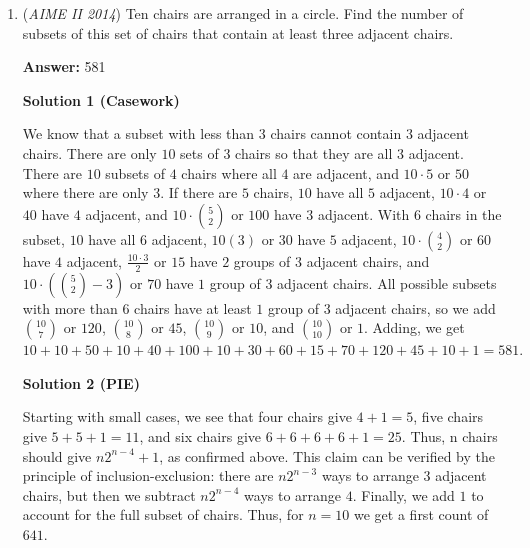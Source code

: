 \begin{enumerate}
 Applying Heron's Formula, we get
 \[\sqrt{2(2-4r)(r)(3r)} = \sqrt{6r^2(2-4r)}.\]We set this equal to $\frac{1}{2}r(2-3r)$. 
 \[\sqrt{6r^2(2-4r)} = \frac{1}{2}r(2-3r).\]This simplifies to the quadratic equation $0 = 9r^2+84r-44$. Remember that we are solving for $3r$, which we will set equal to $x$. Then we now have the equation $0 = x^2 +28x - 44$. Applying the quadratic formula, we get $x=-14 \pm 4\sqrt{15}$. We want the positive solution, so we take $4\sqrt{15}-14 = \sqrt{240}-14$. Our answer is therefore $240 + 14 = \boxed{254}$.

 


	\item (\textit{AIME II 2014}) Ten chairs are arranged in a circle. Find the number of subsets of this set of chairs that contain at least three adjacent chairs.


 
 \textbf{Answer: }581



\textbf{Solution 1 (Casework)}

We know that a subset with less than $3$ chairs cannot contain $3$ adjacent chairs.  There are only $10$ sets of $3$ chairs so that they are all $3$ adjacent.  There are $10$ subsets of $4$ chairs where all $4$ are adjacent, and $10 \cdot 5$ or $50$ where there are only $3.$  If there are $5$ chairs, $10$ have all $5$ adjacent, $10 \cdot 4$ or $40$ have $4$ adjacent, and $10 \cdot {5\choose 2}$ or $100$ have $3$ adjacent.  With $6$ chairs in the subset, $10$ have all $6$ adjacent, $10(3)$ or $30$ have $5$ adjacent, $10 \cdot {4\choose2}$ or $60$ have $4$ adjacent, $\frac{10 \cdot 3}{2}$ or $15$ have $2$ groups of $3$ adjacent chairs, and $10 \cdot \left({5\choose2} - 3\right)$ or $70$ have $1$ group of $3$ adjacent chairs.  All possible subsets with more than $6$ chairs have at least $1$ group of $3$ adjacent chairs, so we add ${10\choose7}$ or $120$, ${10\choose8}$ or $45$, ${10\choose9}$ or $10$, and ${10\choose10}$ or $1.$  Adding, we get $10 + 10 + 50 + 10 + 40 + 100 + 10 + 30 + 60 + 15 + 70 + 120 + 45 + 10 + 1 = \boxed{581}.$




\textbf{Solution 2 (PIE)}

Starting with small cases, we see that four chairs give $4 + 1 = 5$, five chairs give $5 + 5 + 1 = 11$, and six chairs give $6 + 6 + 6 + 6 + 1 = 25.$ Thus, n chairs should give $n 2^{n-4} + 1$, as confirmed above. This claim can be verified by the principle of inclusion-exclusion: there are $n 2^{n-3}$ ways to arrange $3$ adjacent chairs, but then we subtract $n 2^{n-4}$ ways to arrange $4.$ Finally, we add $1$ to account for the full subset of chairs. Thus, for $n = 10$ we get a first count of $641.$


\end{enumerate}
